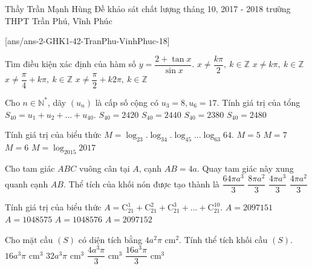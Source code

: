 
\begin{name}
{Thầy Trần Mạnh Hùng}
{Đề khảo sát chất lượng tháng 10, 2017 - 2018 trường THPT Trần Phú, Vĩnh Phúc}
\end{name}
\setcounter{ex}{0}
[ans/ans-2-GHK1-42-TranPhu-VinhPhuc-18]
\begin{ex}%
Tìm điều kiện xác định của hàm số $y=\dfrac{2+\tan x}{\sin x}$.
\choice
{\True $x\ne \dfrac{k\pi}{2},\ k\in\mathbb{Z}$}
{$x\ne k\pi,\ k\in\mathbb{Z}$}
{$x\ne \dfrac{\pi}{4}+k\pi,\ k\in\mathbb{Z}$}
{$x\ne \dfrac{\pi}{2}+k2\pi,\ k\in\mathbb{Z}$}
\end{ex}
\begin{ex}%
Cho $n\in\mathbb{N^*}$, dãy $(u_n)$ là cấp số cộng có $u_3=8,u_6=17$. Tính giá trị của tổng $S_{40}=u_1+u_2+...+u_{40}$.
\choice
{\True $S_{40}=2420$}
{$S_{40}=2440$}
{$S_{40}=2380$}
{$S_{40}=2480$}
\end{ex}
\begin{ex}%
Tính giá trị của biểu thức $M=\log_23.\log_34.\log_45...\log_{63}64$.
\choice
{$M=5$}
{$M=7$}
{\True $M=6$}
{$M=\log_{2015}2017$}
\end{ex}
\begin{ex}%
Cho tam giác $ABC$ vuông cân tại $A$, cạnh $AB=4a$. Quay tam giác này xung quanh cạnh $AB$. Thể tích của khối nón được tạo thành là
\choice
{\True $\dfrac{64\pi a^3}{3}$}
{$\dfrac{8\pi a^2}{3}$}
{$\dfrac{4\pi a^3}{3}$}
{$\dfrac{4\pi a^2}{3}$}
\end{ex}
\begin{ex}%
Tính giá trị của biểu thức $A=\mathrm{C}_{21}^1+\mathrm{C}_{21}^2+\mathrm{C}_{21}^3+...+\mathrm{C}_{21}^{10}$.
\choice
{$A=2097151$}
{\True $A=1048575$}
{$A=1048576$}
{$A=2097152$}
\end{ex}
\begin{ex}%
Cho mặt cầu $(S)$ có diện tích bằng $4a^2\pi$ cm$^2$. Tính thể tích khối cầu $(S)$.
\choice
{$16a^3\pi$ cm$^3$}
{$32a^3\pi$ cm$^3$}
{\True $\dfrac{4a^3\pi}{3}$ cm$^3$}
{$\dfrac{16a^3\pi}{3}$ cm$^3$}
\end{ex}
